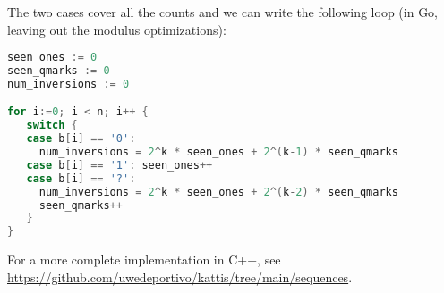 The two cases cover all the counts and we can write the following loop (in Go, leaving out the modulus optimizations):

\newpage

\begin{fullwidth}

\begin{lstlisting}[language=Go, frame=single]  
seen_ones := 0
seen_qmarks := 0
num_inversions := 0

for i:=0; i < n; i++ {
   switch {
   case b[i] == '0': 
     num_inversions = 2^k * seen_ones + 2^(k-1) * seen_qmarks
   case b[i] == '1': seen_ones++
   case b[i] == '?': 
     num_inversions = 2^k * seen_ones + 2^(k-2) * seen_qmarks
     seen_qmarks++
   }
}          
\end{lstlisting}

\end{fullwidth}

For a more complete implementation in C++, see \\
\url{https://github.com/uwedeportivo/kattis/tree/main/sequences}.

